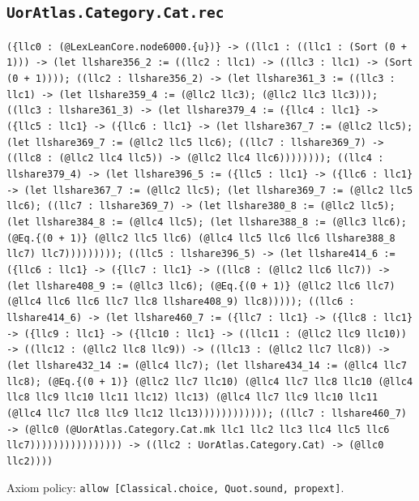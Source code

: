 \documentclass[11pt]{article}
\begin{document}
\subsection*{\texttt{UorAtlas.Category.Cat.rec}}
\noindent\texttt{(\{llc0 : (@LexLeanCore.node6000.\{u\})\} -> ((llc1 : ((llc1 : (Sort (0 + 1))) -> (let llshare356\_2 := ((llc2 : llc1) -> ((llc3 : llc1) -> (Sort (0 + 1)))); ((llc2 : llshare356\_2) -> (let llshare361\_3 := ((llc3 : llc1) -> (let llshare359\_4 := (@llc2 llc3); (@llc2 llc3 llc3))); ((llc3 : llshare361\_3) -> (let llshare379\_4 := (\{llc4 : llc1\} -> (\{llc5 : llc1\} -> (\{llc6 : llc1\} -> (let llshare367\_7 := (@llc2 llc5); (let llshare369\_7 := (@llc2 llc5 llc6); ((llc7 : llshare369\_7) -> ((llc8 : (@llc2 llc4 llc5)) -> (@llc2 llc4 llc6)))))))); ((llc4 : llshare379\_4) -> (let llshare396\_5 := (\{llc5 : llc1\} -> (\{llc6 : llc1\} -> (let llshare367\_7 := (@llc2 llc5); (let llshare369\_7 := (@llc2 llc5 llc6); ((llc7 : llshare369\_7) -> (let llshare380\_8 := (@llc2 llc5); (let llshare384\_8 := (@llc4 llc5); (let llshare388\_8 := (@llc3 llc6); (@Eq.\{(0 + 1)\} (@llc2 llc5 llc6) (@llc4 llc5 llc6 llc6 llshare388\_8 llc7) llc7))))))))); ((llc5 : llshare396\_5) -> (let llshare414\_6 := (\{llc6 : llc1\} -> (\{llc7 : llc1\} -> ((llc8 : (@llc2 llc6 llc7)) -> (let llshare408\_9 := (@llc3 llc6); (@Eq.\{(0 + 1)\} (@llc2 llc6 llc7) (@llc4 llc6 llc6 llc7 llc8 llshare408\_9) llc8))))); ((llc6 : llshare414\_6) -> (let llshare460\_7 := (\{llc7 : llc1\} -> (\{llc8 : llc1\} -> (\{llc9 : llc1\} -> (\{llc10 : llc1\} -> ((llc11 : (@llc2 llc9 llc10)) -> ((llc12 : (@llc2 llc8 llc9)) -> ((llc13 : (@llc2 llc7 llc8)) -> (let llshare432\_14 := (@llc4 llc7); (let llshare434\_14 := (@llc4 llc7 llc8); (@Eq.\{(0 + 1)\} (@llc2 llc7 llc10) (@llc4 llc7 llc8 llc10 (@llc4 llc8 llc9 llc10 llc11 llc12) llc13) (@llc4 llc7 llc9 llc10 llc11 (@llc4 llc7 llc8 llc9 llc12 llc13)))))))))))); ((llc7 : llshare460\_7) -> (@llc0 (@UorAtlas.Category.Cat.mk llc1 llc2 llc3 llc4 llc5 llc6 llc7)))))))))))))))) -> ((llc2 : UorAtlas.Category.Cat) -> (@llc0 llc2))))}\par
\noindent Axiom policy: \texttt{allow [Classical.choice, Quot.sound, propext]}.\par
\end{document}

